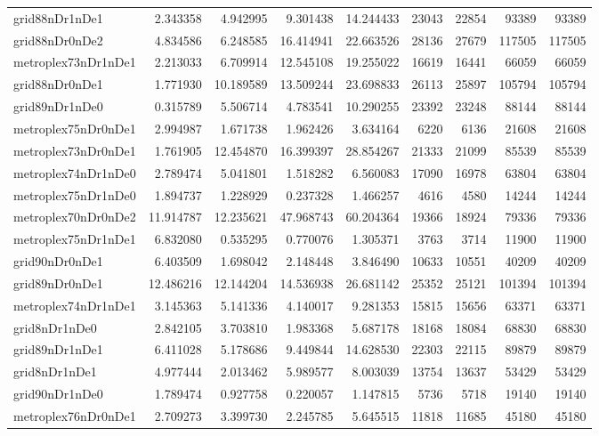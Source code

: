 \begin{longtable}{|l|r|r|r|r|r|r|r|r|}
grid88nDr1nDe1 & 2.343358 & 4.942995 & 9.301438 & 14.244433 & 23043 & 22854 & 93389 & 93389 \\
grid88nDr0nDe2 & 4.834586 & 6.248585 & 16.414941 & 22.663526 & 28136 & 27679 & 117505 & 117505 \\
metroplex73nDr1nDe1 & 2.213033 & 6.709914 & 12.545108 & 19.255022 & 16619 & 16441 & 66059 & 66059 \\
grid88nDr0nDe1 & 1.771930 & 10.189589 & 13.509244 & 23.698833 & 26113 & 25897 & 105794 & 105794 \\
grid89nDr1nDe0 & 0.315789 & 5.506714 & 4.783541 & 10.290255 & 23392 & 23248 & 88144 & 88144 \\
metroplex75nDr0nDe1 & 2.994987 & 1.671738 & 1.962426 & 3.634164 & 6220 & 6136 & 21608 & 21608 \\
metroplex73nDr0nDe1 & 1.761905 & 12.454870 & 16.399397 & 28.854267 & 21333 & 21099 & 85539 & 85539 \\
metroplex74nDr1nDe0 & 2.789474 & 5.041801 & 1.518282 & 6.560083 & 17090 & 16978 & 63804 & 63804 \\
metroplex75nDr1nDe0 & 1.894737 & 1.228929 & 0.237328 & 1.466257 & 4616 & 4580 & 14244 & 14244 \\
metroplex70nDr0nDe2 & 11.914787 & 12.235621 & 47.968743 & 60.204364 & 19366 & 18924 & 79336 & 79336 \\
metroplex75nDr1nDe1 & 6.832080 & 0.535295 & 0.770076 & 1.305371 & 3763 & 3714 & 11900 & 11900 \\
grid90nDr0nDe1 & 6.403509 & 1.698042 & 2.148448 & 3.846490 & 10633 & 10551 & 40209 & 40209 \\
grid89nDr0nDe1 & 12.486216 & 12.144204 & 14.536938 & 26.681142 & 25352 & 25121 & 101394 & 101394 \\
metroplex74nDr1nDe1 & 3.145363 & 5.141336 & 4.140017 & 9.281353 & 15815 & 15656 & 63371 & 63371 \\
grid8nDr1nDe0 & 2.842105 & 3.703810 & 1.983368 & 5.687178 & 18168 & 18084 & 68830 & 68830 \\
grid89nDr1nDe1 & 6.411028 & 5.178686 & 9.449844 & 14.628530 & 22303 & 22115 & 89879 & 89879 \\
grid8nDr1nDe1 & 4.977444 & 2.013462 & 5.989577 & 8.003039 & 13754 & 13637 & 53429 & 53429 \\
grid90nDr1nDe0 & 1.789474 & 0.927758 & 0.220057 & 1.147815 & 5736 & 5718 & 19140 & 19140 \\
metroplex76nDr0nDe1 & 2.709273 & 3.399730 & 2.245785 & 5.645515 & 11818 & 11685 & 45180 & 45180 \\

\end{longtable}
